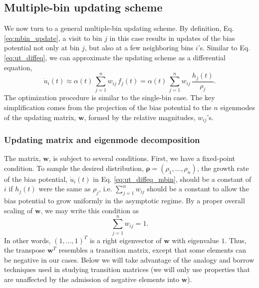 \documentclass[reprint, superscriptaddress, floatfix]{revtex4-1}
\begin{document}
\subsection{\label{sec:multiple-bin}
Multiple-bin updating scheme}



We now turn to a general multiple-bin updating scheme.
%
By definition, Eq. \eqref{eq:mbin_update},
a visit to bin $j$ in this case results in updates of the bias potential
not only at bin $j$, but also at a few neighboring bins $i$'s.
%
Similar to Eq. \eqref{eq:ut_diffeq},
we can approximate the updating scheme
as a differential equation,
%
\begin{equation}
  \dot u_i(t)
  \approx
  \alpha(t) \,
  \sum_{j=1}^n w_{ij} \, f_j(t)
  =
  \alpha(t) \,
  \sum_{j=1}^n w_{ij} \, \frac{ h_j(t) } { \rho_j }
  .
  \label{eq:ut_diffeq_mbin}
\end{equation}
%
The optimization procedure is similar to
the single-bin case.
%
The key simplification comes from the
projection of the bias potential to the $n$ eigenmodes
of the updating matrix, $\mathbf w$,
formed by the relative magnitudes, $w_{ij}$'s.



\subsubsection{\label{sec:updating-matrix}
Updating matrix and eigenmode decomposition}



The matrix, $\mathbf w$, is subject to several conditions.
%
First, we have a fixed-point condition\cite{bussi2006, dama2014}.
%
To sample the desired distribution,
$\pmb\rho = (\rho_1, \dots, \rho_n)$,
the growth rate of the bias potential,
${\dot u}_i(t)$
in Eq. \eqref{eq:ut_diffeq_mbin},
should be a constant of $i$
if $h_j(t)$ were the same as $\rho_j$,
i.e.
$\sum_{j=1}^n w_{ij}$ should be a constant
to allow the bias potential to grow uniformly
in the asymptotic regime.
%
By a proper overall scaling of $\mathbf w$,
we may write this condition as
%
\begin{equation}
  \sum_{j = 1}^n w_{ij} = 1
  .
\label{eq:w_sumj}
\end{equation}
%
In other words, $(1, \dots, 1)^T$
is a right eigenvector of $\mathbf w$
with eigenvalue $1$.
%
Thus, the transpose $\mathbf w^T$
resembles a transition matrix,
except that some elements can be negative
in our cases.
%
Below we will take advantage of the analogy
and borrow techniques used
in studying transition matrices\cite{vankampen}
(we will only use properties that are unaffected
by the admission of negative elements into $\mathbf w$).
\end{document}
